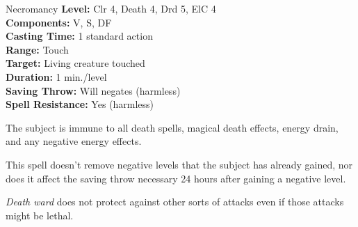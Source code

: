 {Necromancy}
{
	\textbf{Level:}
	Clr 4, Death 4, Drd 5, ElC 4\\
	\textbf{Components:}
	V, S, DF\\
	\textbf{Casting Time:}
	1 standard action\\
	\textbf{Range:}
	Touch\\
	\textbf{Target:}
	Living creature touched\\
	\textbf{Duration:}
	1 min./level\\
	\textbf{Saving Throw:}
	Will negates (harmless)\\
	\textbf{Spell Resistance:}
	Yes (harmless)\\
}
{
	The subject is immune to all death spells, magical death effects, energy drain, and any negative energy effects.

	This spell doesn't remove negative levels that the subject has already gained, nor does it affect the saving throw necessary 24 hours after gaining a negative level.

	\emph{Death ward} does not protect against other sorts of attacks even if those attacks might be lethal.

}
